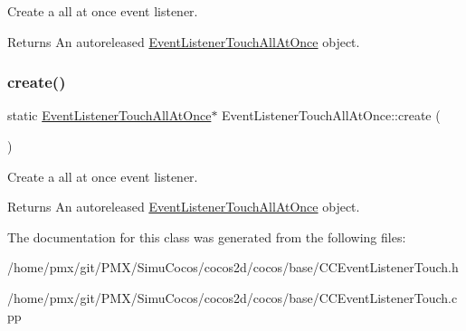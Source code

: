 Create a all at once event listener.

\begin{DoxyReturn}{Returns}
An autoreleased \hyperlink{classEventListenerTouchAllAtOnce}{Event\+Listener\+Touch\+All\+At\+Once} object. 
\end{DoxyReturn}
\mbox{\label{classEventListenerTouchAllAtOnce_a085596935951516ce11ae20234f912cd}} 
\subsubsection{\texorpdfstring{create()}{create()}\hspace{0.1cm}{\footnotesize\ttfamily [2/2]}}
{\footnotesize\ttfamily static \hyperlink{classEventListenerTouchAllAtOnce}{Event\+Listener\+Touch\+All\+At\+Once}$\ast$ Event\+Listener\+Touch\+All\+At\+Once\+::create (\begin{DoxyParamCaption}{ }\end{DoxyParamCaption})\hspace{0.3cm}{\ttfamily [static]}}

Create a all at once event listener.

\begin{DoxyReturn}{Returns}
An autoreleased \hyperlink{classEventListenerTouchAllAtOnce}{Event\+Listener\+Touch\+All\+At\+Once} object. 
\end{DoxyReturn}


The documentation for this class was generated from the following files\+:\begin{DoxyCompactItemize}
\item 
/home/pmx/git/\+P\+M\+X/\+Simu\+Cocos/cocos2d/cocos/base/C\+C\+Event\+Listener\+Touch.\+h\item 
/home/pmx/git/\+P\+M\+X/\+Simu\+Cocos/cocos2d/cocos/base/C\+C\+Event\+Listener\+Touch.\+cpp\end{DoxyCompactItemize}
